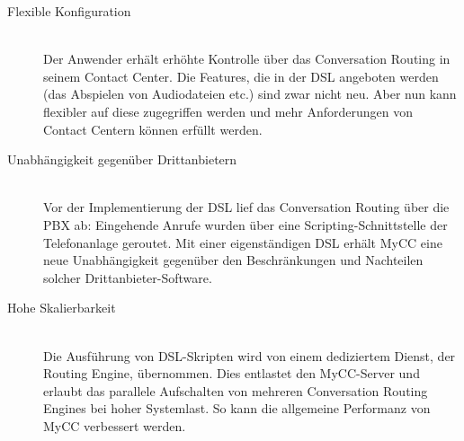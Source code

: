 \begin{description}
\item[Flexible Konfiguration] \hfill \\
Der Anwender erhält erhöhte Kontrolle über das Conversation Routing in seinem Contact Center. Die Features, die in der DSL angeboten werden (das Abspielen von Audiodateien etc.) sind zwar nicht neu. Aber nun kann flexibler auf diese zugegriffen werden und mehr Anforderungen von Contact Centern können erfüllt werden.
\item[Unabhängigkeit gegenüber Drittanbietern] \hfill \\
Vor der Implementierung der DSL lief das Conversation Routing über die PBX ab: Eingehende Anrufe wurden über eine Scripting-Schnittstelle der Telefonanlage geroutet. Mit einer eigenständigen DSL erhält MyCC eine neue Unabhängigkeit gegenüber den Beschränkungen und Nachteilen solcher Drittanbieter-Software.
\item[Hohe Skalierbarkeit] \hfill \\
Die Ausführung von DSL-Skripten wird von einem dediziertem Dienst, der Routing Engine, übernommen. Dies entlastet den MyCC-Server und erlaubt das parallele Aufschalten von mehreren Conversation Routing Engines bei hoher Systemlast. So kann die allgemeine Performanz von MyCC verbessert werden.
\end{description}

